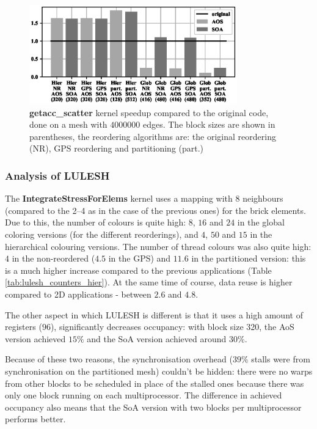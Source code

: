\begin{figure}[Htbp]
  \centering
  \includegraphics[width=9cm]{fig/bookleaf_speedup.eps}
  \caption{\textbf{getacc\_scatter} kernel speedup compared to the original
  code, done on a mesh with $4000000$ edges. The block sizes are shown in
  parentheses, the reordering algorithms are: the original reordering (NR), GPS
  reordering and partitioning (part.)}
  \label{fig:bookleaf_speedup}
\end{figure}

\subsubsection{Analysis of LULESH}\label{sec:analysis-of-lulesh}


The \textbf{IntegrateStressForElems} kernel uses a mapping with 8 neighbours
(compared to the 2--4 as in the case of the previous ones) for the brick
elements. Due to this, the number of colours is quite high: $8$, $16$ and $24$
in the global coloring versions (for the different reorderings), and $4$, $50$
and $15$ in the hierarchical colouring versions. The number of thread colours
was also quite high: $4$ in the non-reordered ($4.5$ in the GPS) and $11.6$ in
the partitioned version: this is a much higher increase compared to the previous
applications (Table \ref{tab:lulesh_counters_hier}). At the same time of course,
data reuse is higher compared to 2D applications - between $2.6$ and $4.8$.

The other aspect in which LULESH is different is that it uses a high amount of
registers ($96$), significantly decreases occupancy: with block size 320, the
AoS version achieved $15\%$ and the SoA version achieved around $30\%$.

Because of these two reasons, the synchronisation overhead ($39\%$ stalls were
from synchronisation on the partitioned mesh) couldn't be hidden: there were no
warps from other blocks to be scheduled in place of the stalled ones because
there was only one block running on each multiprocessor. The difference in
achieved occupancy also means that the SoA version with two blocks per
multiprocessor performs better.

